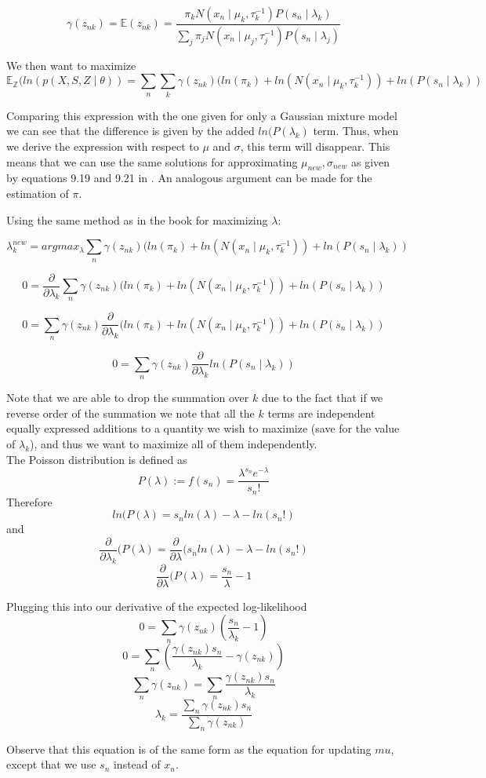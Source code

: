 \documentclass[11pt,a4paper]{article}
\begin{document}
$$\gamma(z_{nk}) = \mathbb{E}(z_{nk}) = \frac{\pi_{k}N(x_{n} \mid \mu_{k}, \tau_{k}^{-1})P(s_{n} \mid \lambda_{k})}{\sum_{j}\pi_{j}N(x_{n} \mid \mu_{j}, \tau_{j}^{-1})P(s_{n} \mid \lambda_{j})}$$

We then want to maximize $$ \mathbb{E_{Z}}(ln(p(X, S, Z \mid \theta)) = \sum_{n} \sum_{k}\gamma(z_{nk})(ln(\pi_{k}) + ln(N(x_{n} \mid \mu_{k}, \tau_{k}^{-1})) + ln(P(s_{n} \mid \lambda_{k}))$$

Comparing this expression with the one given for only a Gaussian mixture model we can see that the difference is given by the added $ln(P(\lambda_{k})$ term. Thus, when we derive the expression with respect to $\mu$ and $\sigma$, this term will disappear. This means that we can use the same solutions for approximating $\mu_{new}, \sigma_{new}$ as given by equations 9.19 and 9.21 in \cite{book}. An analogous argument can be made for the estimation of $\pi$.

Using the same method as in the book for maximizing $\lambda$:


$$ \lambda_{k}^{new} =argmax_{\lambda} \sum_{n} \gamma(z_{nk})(ln(\pi_{k}) + ln(N(x_{n} \mid \mu_{k}, \tau_{k}^{-1})) + ln(P(s_{n} \mid \lambda_{k}))$$

$$ 0 = \frac{\partial}{\partial \lambda_{k}}\sum_{n} \gamma(z_{nk})(ln(\pi_{k}) + ln(N(x_{n} \mid \mu_{k}, \tau_{k}^{-1})) + ln(P(s_{n} \mid \lambda_{k}))$$

$$ 0 = \sum_{n} \gamma(z_{nk})\frac{\partial}{\partial \lambda_{k}}(ln(\pi_{k}) + ln(N(x_{n} \mid \mu_{k}, \tau_{k}^{-1})) + ln(P(s_{n} \mid \lambda_{k}))$$

$$ 0 = \sum_{n} \gamma(z_{nk})\frac{\partial}{\partial \lambda_{k}}ln(P(s_{n} \mid \lambda_{k}))$$

Note that we are able to drop the summation over $k$ due to the fact that if we reverse order of the summation we note that all the $k$ terms are independent equally expressed additions to a quantity we wish to maximize (save for the value of $\lambda_{k}$), and thus we want to maximize all of them independently.\\

The Poisson distribution is defined as
$$ P(\lambda) := f(s_{n}) = \frac{\lambda^{s_{n}}e^{-\lambda}}{s_{n}!} $$
Therefore
$$ln(P(\lambda) = s_{n}ln(\lambda) - \lambda - ln(s_{n}!)$$
and
$$\frac{\partial}{\partial \lambda_{k}}(P(\lambda) = \frac{\partial}{\partial \lambda}(s_{n}ln(\lambda) - \lambda - ln(s_{n}!)$$
$$\frac{\partial}{\partial \lambda}(P(\lambda) = \frac{s_{n}}{\lambda} - 1$$

Plugging this into our derivative of the expected log-likelihood
$$ 0 = \sum_{n} \gamma(z_{nk})(\frac{s_{n}}{\lambda_{k}} - 1)$$
$$ 0 = \sum_{n} (\frac{\gamma(z_{nk})s_{n}}{\lambda_{k}} - \gamma(z_{nk}))$$
$$ \sum_{n}\gamma(z_{nk}) = \sum_{n} \frac{\gamma(z_{nk})s_{n}}{\lambda_{k}} $$
$$ \lambda_{k} =  \frac{\sum_{n}\gamma(z_{nk})s_{n}}{\sum_{n}\gamma(z_{nk})} $$

Observe that this equation is of the same form as the equation for updating $mu$, except that we use $s_{n}$ instead of $x_{n}$.	






\end{document}

